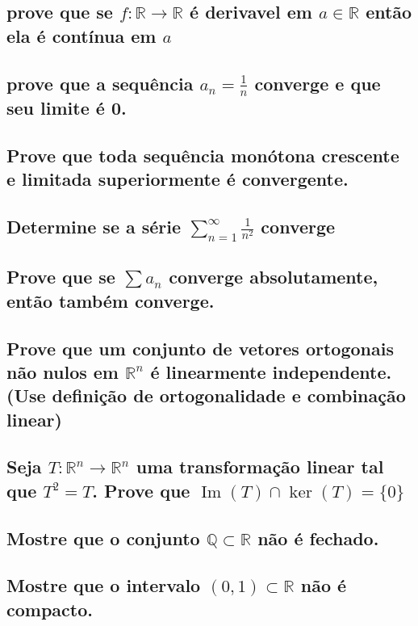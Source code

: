 \documentclass{article}
\begin{document}
\subsection{prove que se $f: \mathbb{R} \to \mathbb{R}$ é derivavel em $a \in \mathbb{R}$ então ela é contínua em $a$}

\subsection{prove que a sequência $a_n = \frac{1}{n}$ converge e que seu limite é 0.}

\subsection{Prove que toda sequência monótona crescente e limitada superiormente é convergente.}

\subsection{Determine se a série $\sum_{n=1}^{\infty} \frac{1}{n^2}$ converge}

\subsection{Prove que se $\sum a_n$ converge absolutamente, então também converge.}

\subsection{Prove que um conjunto de vetores ortogonais não nulos em $\mathbb{R}^n$ é linearmente independente. (Use definição de ortogonalidade e combinação linear)}

\subsection{Seja $T: \mathbb{R}^n \to \mathbb{R}^n$ uma transformação linear tal que $T^2 = T$. Prove que $\operatorname{Im}(T) \cap \ker(T) = \{0\}$}

\subsection{Mostre que o conjunto $\mathbb{Q} \subset \mathbb{R}$ não é fechado.}

\subsection{Mostre que o intervalo $(0,1) \subset \mathbb{R}$ não é compacto.}
\end{document}
